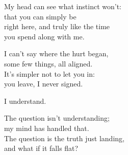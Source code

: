 \begin{lyrics}
My head can see what instinct won't:\\
that you can simply be\\
right here, and truly like the time\\
you spend along with me.

I can't say where the hurt began,\\
some few things, all aligned.\\
It's simpler not to let you in:\\
you leave, I never signed.

I understand.

The question isn't understanding;\\
my mind has handled that.\\
The question is the truth just landing,\\
and what if it falls flat?
\end{lyrics}

